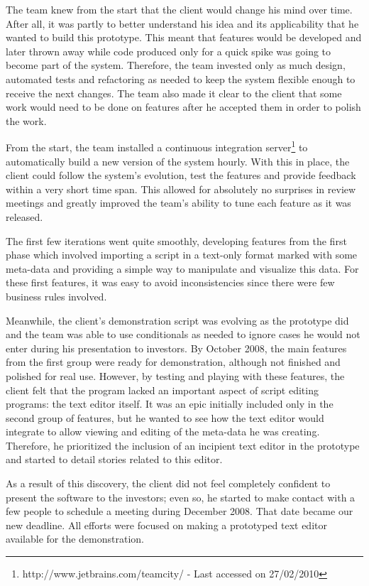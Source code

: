 \documentclass[lnbip]{svmultln}
\begin{document}
The team knew from the start that the client would change his mind
over time. After all, it was partly to better understand his idea and
its applicability that he wanted to build this prototype. This meant
that features would be developed and later thrown away while code
produced only for a quick spike was going to become part of the
system. Therefore, the team invested only as much design, automated
tests and refactoring as needed to keep the system flexible enough to
receive the next changes. The team also made it clear to the client
that some work would need to be done on features after he accepted
them in order to polish the work.

From the start, the team installed a continuous integration
server\footnote{http://www.jetbrains.com/teamcity/ - Last accessed on
  27/02/2010} to automatically build a new version of the system
hourly. With this in place, the client could follow the system's
evolution, test the features and provide feedback within a very short
time span. This allowed for absolutely no surprises in review meetings
and greatly improved the team's ability to tune each feature as it was
released.

The first few iterations went quite smoothly, developing features from
the first phase which involved importing a script in a text-only
format marked with some meta-data and providing a simple way to
manipulate and visualize this data. For these first features, it was
easy to avoid inconsistencies since there were few business rules
involved.

Meanwhile, the client's demonstration script was evolving as the
prototype did and the team was able to use conditionals as needed to
ignore cases he would not enter during his presentation to
investors. By October 2008, the main features from the first group
were ready for demonstration, although not finished and polished for
real use. However, by testing and playing with these features, the
client felt that the program lacked an important aspect of script
editing programs: the text editor itself. It was an epic initially
included only in the second group of features, but he wanted to see
how the text editor would integrate to allow viewing and editing of
the meta-data he was creating. Therefore, he prioritized the inclusion
of an incipient text editor in the prototype and started to detail
stories related to this editor.

As a result of this discovery, the client did not feel completely
confident to present the software to the investors; even so, he
started to make contact with a few people to schedule a meeting during
December 2008. That date became our new deadline. All efforts were
focused on making a prototyped text editor available for the
demonstration.
\end{document}
